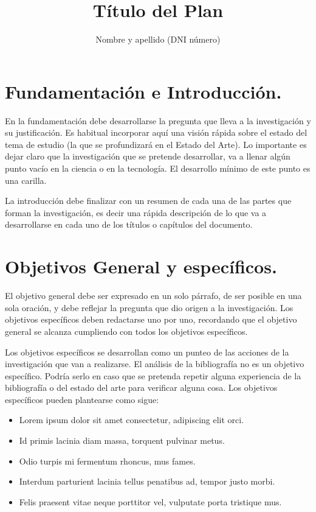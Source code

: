 \documentclass{untref-plan}
\title{Título del Plan}
\author{Nombre y apellido (DNI número)}
\begin{document}
\maketitle

\section{Fundamentación e Introducción.}

En la fundamentación debe desarrollarse la pregunta que lleva a la investigación y su justificación. Es habitual incorporar aquí una visión rápida sobre el estado del tema de estudio (la que se profundizará en el Estado del Arte). Lo importante es dejar claro que la investigación que se pretende desarrollar, va a llenar algún punto vacío en la ciencia o en la tecnología. El desarrollo mínimo de este punto es una carilla.

La introducción debe finalizar con un resumen de cada una de las partes que forman la investigación, es decir una rápida descripción de lo que va a desarrollarse en cada uno de los títulos o capítulos del documento.

\section{Objetivos General y específicos.}

El objetivo general debe ser expresado en un solo párrafo, de ser posible en una sola oración, y debe reflejar la pregunta que dio origen a la investigación. Los objetivos específicos deben redactarse uno por uno, recordando que el objetivo general se alcanza cumpliendo con todos los objetivos específicos.

Los objetivos específicos se desarrollan como un punteo de las acciones de la investigación que van a realizarse. El análisis de la bibliografía no es un objetivo específico. Podría serlo en caso que se pretenda repetir alguna experiencia de la bibliografía o del estado del arte para verificar alguna cosa. Los objetivos específicos pueden plantearse como sigue:

\begin{itemize}
  \item Lorem ipsum dolor sit amet consectetur, adipiscing elit orci.
  \item Id primis lacinia diam massa, torquent pulvinar metus.
  \item Odio turpis mi fermentum rhoncus, mus fames.
  \item Interdum parturient lacinia tellus penatibus ad, tempor justo morbi.
  \item Felis praesent vitae neque porttitor vel, vulputate porta tristique mus.
\end{itemize}
\end{document}
